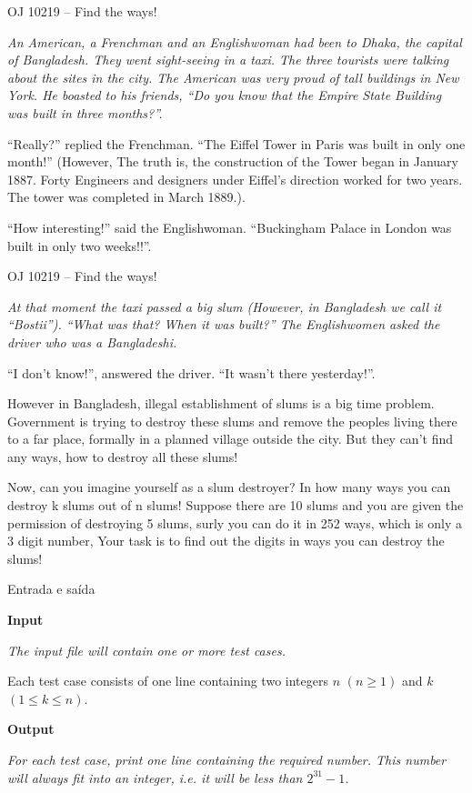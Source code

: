 \begin{frame}[fragile]{OJ 10219 -- Find the ways!}

{\it
An American, a Frenchman and an Englishwoman had been to Dhaka, the capital of Bangladesh. They
went sight-seeing in a taxi. The three tourists were talking about the sites in the city. The American
was very proud of tall buildings in New York. He boasted to his friends, ``Do you know that the Empire
State Building was built in three months?''.

``Really?'' replied the Frenchman. ``The Eiffel Tower in Paris was built in only one month!''
(However, The truth is, the construction of the Tower began in January 1887. Forty Engineers and
designers under Eiffel’s direction worked for two years. The tower was completed in March 1889.).

``How interesting!'' said the Englishwoman. ``Buckingham Palace in London was built in only two
weeks!!''.
}

\end{frame}

\begin{frame}[fragile]{OJ 10219 -- Find the ways!}

{\it
At that moment the taxi passed a big slum (However, in Bangladesh we call it ``Bostii''). ``What
was that? When it was built?'' The Englishwomen asked the driver who was a Bangladeshi.

``I don’t know!'', answered the driver. ``It wasn’t there yesterday!''.

However in Bangladesh, illegal establishment of slums is a big time problem. Government is trying
to destroy these slums and remove the peoples living there to a far place, formally in a planned village
outside the city. But they can’t find any ways, how to destroy all these slums!

Now, can you imagine yourself as a slum destroyer? In how many ways you can destroy k slums out
of n slums! Suppose there are 10 slums and you are given the permission of destroying 5 slums, surly
you can do it in 252 ways, which is only a 3 digit number, Your task is to find out the digits in ways
you can destroy the slums!
}

\end{frame}

\begin{frame}[fragile]{Entrada e saída}

\textbf{Input}

{\it The input file will contain one or more test cases.

Each test case consists of one line containing two integers $n$ $(n \geq 1)$ and $k$ $(1 \leq k \leq n)$.}

\vspace{0.3in}


\textbf{Output}

{\it For each test case, print one line containing the required number. This number will always fit into an
integer, i.e. it will be less than $2^{31} - 1$.}

\end{frame}

